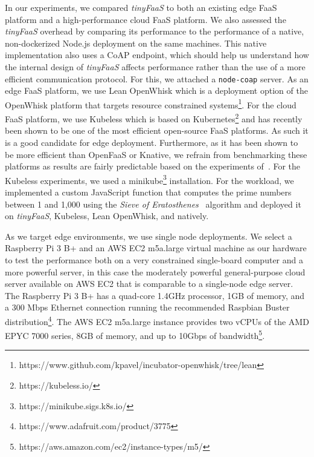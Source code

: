 In our experiments, we compared \textit{tinyFaaS} to both an existing edge FaaS platform and a high-performance cloud FaaS platform.
We also assessed the \textit{tinyFaaS} overhead by comparing its performance to the performance of a native, non-dockerized Node.js deployment on the same machines.
This native implementation also uses a CoAP endpoint, which should help us understand how the internal design of \textit{tinyFaaS} affects performance rather than the use of a more efficient communication protocol.
For this, we attached a \texttt{node-coap} server.
As an edge FaaS platform, we use Lean OpenWhisk which is a deployment option of the OpenWhisk platform that targets resource constrained systems\footnote{https://www.github.com/kpavel/incubator-openwhisk/tree/lean}.
For the cloud FaaS platform, we use Kubeless which is based on Kubernetes\footnote{https://kubeless.io/} and has recently been shown to be one of the most efficient open-source FaaS platforms.
As such it is a good candidate for edge deployment.
Furthermore, as it has been shown to be more efficient than OpenFaaS or Knative, we refrain from benchmarking these platforms as results are fairly predictable based on the experiments of~\cite{Palade2019-mo}.
For the Kubeless experiments, we used a minikube\footnote{https://minikube.sigs.k8s.io/} installation.
For the workload, we implemented a custom JavaScript function that computes the prime numbers between 1 and 1,000 using the \textit{Sieve of Eratosthenes}~\cite{sieve} algorithm and deployed it on \textit{tinyFaaS}, Kubeless, Lean OpenWhisk, and natively.

As we target edge environments, we use single node deployments.
We select a Raspberry Pi 3 B+ and an AWS EC2 m5a.large virtual machine as our hardware to test the performance both on a very constrained single-board computer and a more powerful server, in this case the moderately powerful general-purpose cloud server available on AWS EC2 that is comparable to a single-node edge server.
The Raspberry Pi 3 B+ has a quad-core 1.4GHz processor, 1GB of memory, and a 300 Mbps Ethernet connection running the recommended Raspbian Buster distribution\footnote{https://www.adafruit.com/product/3775}.
The AWS EC2 m5a.large instance provides two vCPUs of the AMD EPYC 7000 series, 8GB of memory, and up to 10Gbps of bandwidth\footnote{https://aws.amazon.com/ec2/instance-types/m5/}.


